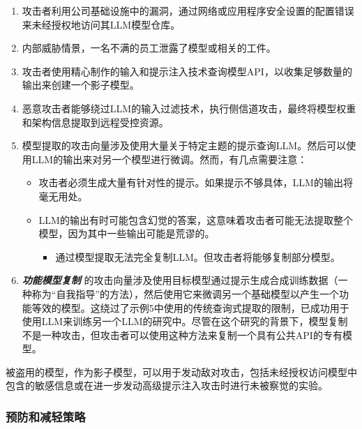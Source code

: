 \documentclass[
]{article}
\providecommand{\tightlist}{%
  \setlength{\itemsep}{0pt}\setlength{\parskip}{0pt}}
\begin{document}
\begin{enumerate}
\def\labelenumi{\arabic{enumi}.}
\tightlist
\item
  攻击者利用公司基础设施中的漏洞，通过网络或应用程序安全设置的配置错误来未经授权地访问其LLM模型仓库。
\item
  内部威胁情景，一名不满的员工泄露了模型或相关的工件。
\item
  攻击者使用精心制作的输入和提示注入技术查询模型API，以收集足够数量的输出来创建一个影子模型。
\item
  恶意攻击者能够绕过LLM的输入过滤技术，执行侧信道攻击，最终将模型权重和架构信息提取到远程受控资源。
\item
  模型提取的攻击向量涉及使用大量关于特定主题的提示查询LLM。然后可以使用LLM的输出来对另一个模型进行微调。然而，有几点需要注意：

  \begin{itemize}
  \tightlist
  \item
    攻击者必须生成大量有针对性的提示。如果提示不够具体，LLM的输出将毫无用处。
  \item
    LLM的输出有时可能包含幻觉的答案，这意味着攻击者可能无法提取整个模型，因为其中一些输出可能是荒谬的。

    \begin{itemize}
    \tightlist
    \item
      通过模型提取无法完全复制LLM。但攻击者将能够复制部分模型。
    \end{itemize}
  \end{itemize}
\item
  \textbf{\emph{功能模型复制}}
  的攻击向量涉及使用目标模型通过提示生成合成训练数据（一种称为``自我指导''的方法），然后使用它来微调另一个基础模型以产生一个功能等效的模型。这绕过了示例5中使用的传统查询式提取的限制，已成功用于使用LLM来训练另一个LLM的研究中。尽管在这个研究的背景下，模型复制不是一种攻击，但攻击者可以使用这种方法来复制一个具有公共API的专有模型。
\end{enumerate}

被盗用的模型，作为影子模型，可以用于发动敌对攻击，包括未经授权访问模型中包含的敏感信息或在进一步发动高级提示注入攻击时进行未被察觉的实验。

\subsubsection{预防和减轻策略}\label{ux9884ux9632ux548cux51cfux8f7bux7b56ux7565}
\end{document}
